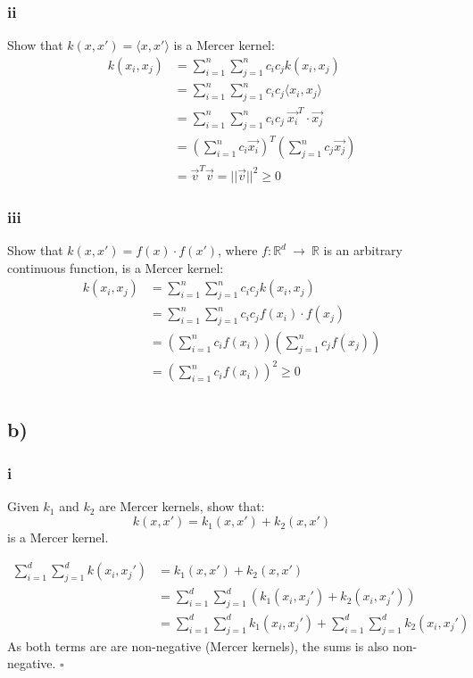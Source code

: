 \documentclass{article}
\begin{document}
\subsubsection*{ii}
Show that
$k(x,x') = \langle x,x' \rangle$ is a Mercer kernel:\\
\begin{align}
k(x_i,x_j) &=\sum_{i=1}^n \sum_{j=1}^n c_i c_j k(x_i,x_j) \\
&= \sum_{i=1}^n \sum_{j=1}^n c_i c_j \langle x_i,x_j \rangle \\
&= \sum_{i=1}^n \sum_{j=1}^n c_i c_j \  \vec{x_i}^T \cdot \vec{x_j}  \\
&= (\sum_{i=1}^n c_i \vec{x_i})^T (\sum_{j=1}^n c_j \vec{x_j})  \\
&= \vec{v}^T \vec{v} = || \vec{v} ||^2 \geq 0
\end{align}

\subsubsection*{iii}
Show that $
k(x,x') = f(x)\cdot f(x')$, where $f:\mathbb{R}^d~\rightarrow~\mathbb{R}$ is an arbitrary continuous function, is a Mercer kernel:\\
\begin{align}
k(x_i,x_j) &=\sum_{i=1}^n \sum_{j=1}^n c_i c_j k(x_i,x_j) \\
&= \sum_{i=1}^n \sum_{j=1}^n c_i c_j f(x_i) \cdot f(x_j) \\
&= (\sum_{i=1}^n c_i f(x_i))(\sum_{j=1}^n c_j f(x_j)) \\
&= (\sum_{i=1}^n c_i f(x_i))^2 \geq 0 \\
\end{align}


\subsection*{b)}

\subsubsection*{i}
Given $k_1$ and $k_2$ are Mercer kernels, show that:
\begin{equation}
    k(x, x') = k_1(x, x') + k_2(x, x')
\end{equation}
is a Mercer kernel.

\begin{align}
    \sum_{i=1}^d \sum_{j=1}^d k(x_i, x_j') &= k_1(x, x') + k_2(x, x') \\
    &= \sum_{i=1}^d \sum_{j=1}^d (k_1(x_i, x_j') + k_2(x_i, x_j'))\\
    &= \sum_{i=1}^d \sum_{j=1}^d k_1(x_i, x_j') + \sum_{i=1}^d \sum_{j=1}^d  k_2(x_i, x_j')
\end{align}
As both terms are are non-negative (Mercer kernels), the sums is also non-negative.
\hfill $\square$
\end{document}
